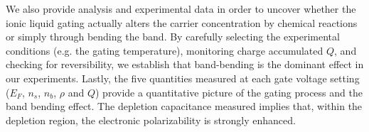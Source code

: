 We also provide analysis and experimental data in order to uncover whether the ionic liquid gating actually alters the carrier concentration by chemical
reactions or simply through bending the band. 
By carefully selecting the experimental conditions (e.g. the gating temperature),
monitoring charge accumulated $Q$, and checking for reversibility, we establish that band-bending is the dominant effect
in our experiments. Lastly, the five quantities measured at each gate voltage setting ($E_F$, $n_s$, $n_b$, $\rho$ and $Q$)
provide a quantitative picture of the gating process and the band bending effect. The depletion
capacitance measured implies that, within the depletion region, the electronic polarizability is strongly enhanced.
